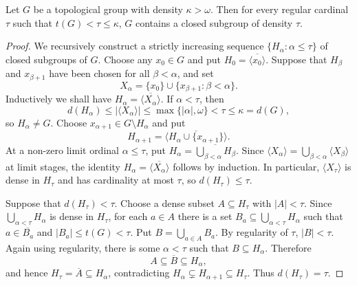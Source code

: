 \documentclass[10pt,a4paper]{amsart}
\begin{document}
\begin{proposition}\label{Prop:t}
Let $G$ be a topological group with density $\kappa > \omega$. Then for every regular cardinal $\tau$ such that $t(G) < \tau \le \kappa$, $G$ contains a closed subgroup of density $\tau$.
\end{proposition}

\begin{proof}
We recursively construct a strictly increasing sequence
$\{H_\alpha:\alpha\leq\tau\}$ of closed subgroups of $G$. Choose any
$x_0\in G$ and put $H_0=\overline{\langle x_0\rangle}$. Suppose that
$H_\beta$ and $x_{\beta+1}$ have been chosen for all $\beta<\alpha$, and set
\[
X_\alpha=\{x_0\}\cup\{x_{\beta+1}:\beta<\alpha\}.
\]
Inductively we shall have $H_\alpha=\overline{\langle X_\alpha\rangle}$.
If $\alpha<\tau$, then
\[
d(H_\alpha)\leq |\langle X_\alpha\rangle|
\leq\max\{|\alpha|,\omega\}<\tau\leq\kappa=d(G),
\]
so $H_\alpha\neq G$. Choose $x_{\alpha+1}\in G\setminus H_\alpha$ and put
\[
H_{\alpha+1}=\overline{\langle H_\alpha\cup\{x_{\alpha+1}\}\rangle}.
\]
At a non-zero limit ordinal $\alpha\leq\tau$, put
$H_\alpha=\overline{\bigcup_{\beta<\alpha}H_\beta}$. Since
$\langle X_\alpha\rangle=\bigcup_{\beta<\alpha}\langle X_\beta\rangle$
at limit stages, the identity
$H_\alpha=\overline{\langle X_\alpha\rangle}$ follows by induction.
In particular, $\langle X_\tau\rangle$ is dense in $H_\tau$ and has
cardinality at most $\tau$, so $d(H_\tau)\leq\tau$.

Suppose that $d(H_\tau)<\tau$. Choose a dense subset $A\subseteq H_\tau$ with $|A|<\tau$. Since $\bigcup_{\alpha<\tau}H_\alpha$ is dense in $H_\tau$, for each $a\in A$ there is a set
$B_a\subseteq\bigcup_{\alpha<\tau}H_\alpha$ such that
$a\in\overline{B_a}$ and $|B_a|\leq t(G)<\tau$. Put $B=\bigcup_{a\in A}B_a$. By regularity of $\tau$, $|B|<\tau$. Again using regularity, there is some $\alpha<\tau$ such that $B\subseteq H_\alpha$. Therefore
\[
A\subseteq\overline B\subseteq H_\alpha,
\]
and hence $H_\tau=\overline A\subseteq H_\alpha$, contradicting
$H_\alpha\subsetneq H_{\alpha+1}\subseteq H_\tau$. Thus $d(H_\tau)=\tau$.
\end{proof}
\end{document}

